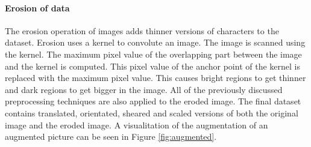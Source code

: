 \documentclass{article}
\begin{document}
\paragraph{Erosion of data}
The erosion operation of images adds thinner versions of characters to the dataset. Erosion uses a kernel to convolute an image.
The image is scanned using the kernel. The maximum pixel value of the overlapping part between the image and the kernel is computed. This pixel value of the anchor point of the kernel is replaced with the maximum pixel value.
This causes bright regions to get thinner and dark regions to get bigger in the image.
All of the previously discussed preprocessing techniques are also applied to the eroded image. The final dataset contains translated, orientated, sheared and scaled versions of both the original image and the eroded image. A visualitation of the augmentation of an augmented picture can be seen in Figure \ref{fig:augmented}.
\end{document}
